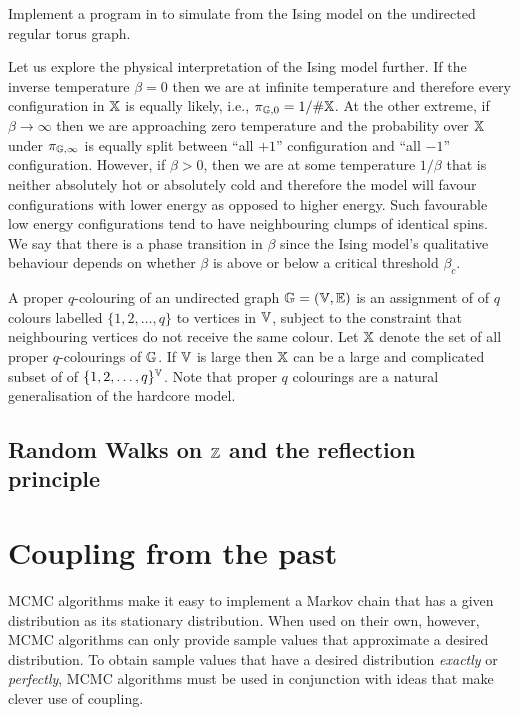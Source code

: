 \begin{labwork}
Implement a program in \Matlab to simulate from the Ising model on the undirected regular torus graph. 
\end{labwork}

Let us explore the physical interpretation of the Ising model further.  
If the inverse temperature $\beta=0$ then we are at infinite temperature and therefore every configuration in $\mathbb{X}$ is equally likely, i.e., $\pi_{\mathbb{G},0} = 1/\# \mathbb{X}$.  
At the other extreme, if $\beta \to \infty$ then we are approaching zero temperature and the probability over $\mathbb{X}$ under $\pi_{\mathbb{G},\infty}$ is equally split between ``all $+1$'' configuration and ``all $-1$'' configuration.  
However, if $\beta > 0$, then we are at some temperature $1/\beta$ that is neither absolutely hot or absolutely cold and therefore the model will favour configurations with lower energy as opposed to higher energy.  Such favourable low energy configurations tend to have neighbouring clumps of identical spins.  
We say that there is a phase transition in $\beta$ since the Ising model's qualitative behaviour depends on whether $\beta$ is above or below a critical threshold $\beta_c$. 

\begin{model}
A proper $q$-colouring of an undirected graph $\mathbb{G}=(\mathbb{V},\mathbb{E})$ is an assignment of of $q$ colours labelled $\{1,2,\ldots,q\}$ to vertices in $\mathbb{V}$, subject to the constraint that neighbouring vertices do not receive the same colour.  
Let $\mathbb{X}$ denote the set of all proper $q$-colourings of $\mathbb{G}$.  
If $\mathbb{V}$ is large then $\mathbb{X}$ can be a large and complicated subset of of $\{1,2,\ldots,q\}^{\mathbb{V}}$.  
Note that proper $q$ colourings are a natural generalisation of the hardcore model.
\end{model}


\subsection{Random Walks on $\mathbb{Z}$ and the reflection principle}
\work

\section{Coupling from the past}



MCMC algorithms make it easy to implement a Markov chain that has a given distribution as its stationary distribution. When used on their own, however, MCMC algorithms can only provide sample values that approximate a desired distribution. To obtain sample values that have a desired distribution {\it exactly} or {\it perfectly}, MCMC algorithms must be used in conjunction with ideas that make clever use of coupling.

